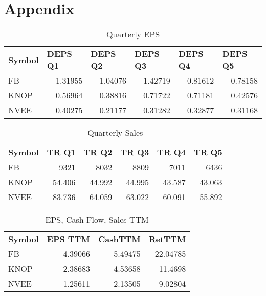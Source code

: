 \documentclass{article}
\begin{document}
\section{Appendix}
\begin{table}[htbp]
  \caption{Quarterly EPS}
    \begin{tabular}{lrrrrr}
    \textbf{Symbol} & \multicolumn{1}{l}{\textbf{DEPS Q1}} & \multicolumn{1}{l}{\textbf{DEPS Q2}} & \multicolumn{1}{l}{\textbf{DEPS Q3}} & \multicolumn{1}{l}{\textbf{DEPS Q4}} & \multicolumn{1}{l}{\textbf{DEPS Q5}} \\
    FB    & 1.31955 & 1.04076 & 1.42719 & 0.81612 & 0.78158 \\
    KNOP  & 0.56964 & 0.38816 & 0.71722 & 0.71181 & 0.42576 \\
    NVEE  & 0.40275 & 0.21177 & 0.31282 & 0.32877 & 0.31168 \\
    \end{tabular}%
  \label{tab:addlabel}%
\end{table}%

\begin{table}[htbp]
  \caption{Quarterly Sales}
    \begin{tabular}{lrrrrr}
    \textbf{Symbol} & \multicolumn{1}{l}{\textbf{TR Q1}} & \multicolumn{1}{l}{\textbf{TR Q2}} & \multicolumn{1}{l}{\textbf{TR Q3}} & \multicolumn{1}{l}{\textbf{TR Q4}} & \multicolumn{1}{l}{\textbf{TR Q5}} \\
    FB    & 9321  & 8032  & 8809  & 7011  & 6436 \\
    KNOP  & 54.406 & 44.992 & 44.995 & 43.587 & 43.063 \\
    NVEE  & 83.736 & 64.059 & 63.022 & 60.091 & 55.892 \\
    \end{tabular}%
  \label{tab:addlabel}%
\end{table}%

\begin{table}[htbp]
  \caption{EPS, Cash Flow, Sales TTM}
    \begin{tabular}{lrrr}
    \textbf{Symbol} & \multicolumn{1}{l}{\textbf{EPS TTM}} & \multicolumn{1}{l}{\textbf{CashTTM}} & \multicolumn{1}{l}{\textbf{RetTTM}} \\
    FB    & 4.39066 & 5.49475 & 22.04785 \\
    KNOP  & 2.38683 & 4.53658 & 11.4698 \\
    NVEE  & 1.25611 & 2.13505 & 9.02804 \\
    \end{tabular}%
  \label{tab:addlabel}%
\end{table}%
\end{document}
